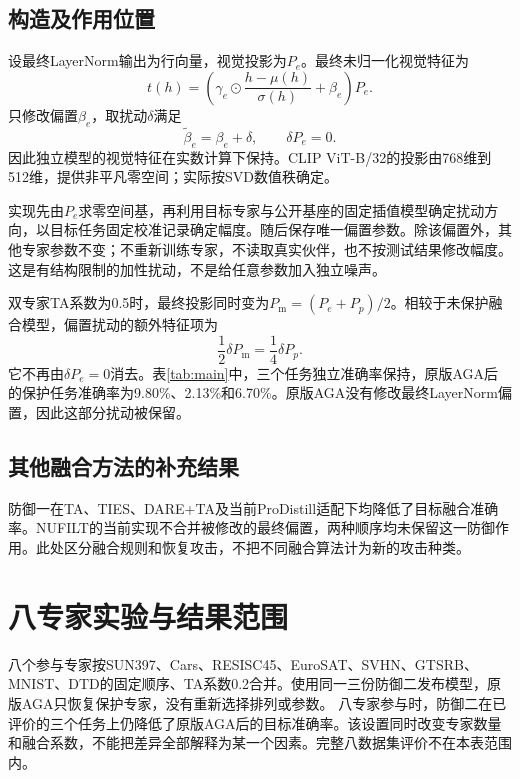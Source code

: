 \documentclass[11pt,a4paper]{article}
\begin{document}
\subsection{构造及作用位置}
设最终LayerNorm输出为行向量，视觉投影为$P_e$。最终未归一化视觉特征为
\begin{equation}
t(h)=\left(\gamma_e\odot\frac{h-\mu(h)}{\sigma(h)}+\beta_e\right)P_e.
\end{equation}
只修改偏置$\beta_e$，取扰动$\delta$满足
\begin{equation}
\widetilde\beta_e=\beta_e+\delta,\qquad\delta P_e=0.
\end{equation}
因此独立模型的视觉特征在实数计算下保持。CLIP ViT-B/32的投影由768维到512维，提供非平凡零空间；实际按SVD数值秩确定。

实现先由$P_e$求零空间基，再利用目标专家与公开基座的固定插值模型确定扰动方向，以目标任务固定校准记录确定幅度。随后保存唯一偏置参数。除该偏置外，其他专家参数不变；不重新训练专家，不读取真实伙伴，也不按测试结果修改幅度。这是有结构限制的加性扰动，不是给任意参数加入独立噪声。

双专家TA系数为0.5时，最终投影同时变为$P_{\mathrm m}=(P_e+P_p)/2$。相较于未保护融合模型，偏置扰动的额外特征项为
\begin{equation}
\frac12\delta P_{\mathrm m}=\frac14\delta P_p.
\end{equation}
它不再由$\delta P_e=0$消去。表\ref{tab:main}中，三个任务独立准确率保持，原版AGA后的保护任务准确率为9.80\%、2.13\%和6.70\%。原版AGA没有修改最终LayerNorm偏置，因此这部分扰动被保留。

\subsection{其他融合方法的补充结果}
\reporttablesupplement
防御一在TA、TIES、DARE+TA及当前ProDistill适配下均降低了目标融合准确率。NUFILT的当前实现不合并被修改的最终偏置，两种顺序均未保留这一防御作用。此处区分融合规则和恢复攻击，不把不同融合算法计为新的攻击种类。

\clearpage
\section{八专家实验与结果范围}
八个参与专家按SUN397、Cars、RESISC45、EuroSAT、SVHN、GTSRB、MNIST、DTD的固定顺序、TA系数0.2合并。使用同一三份防御二发布模型，原版AGA只恢复保护专家，没有重新选择排列或参数。
\reporttableeight
八专家参与时，防御二在已评价的三个任务上仍降低了原版AGA后的目标准确率。该设置同时改变专家数量和融合系数，不能把差异全部解释为某一个因素。完整八数据集评价不在本表范围内。
\end{document}
